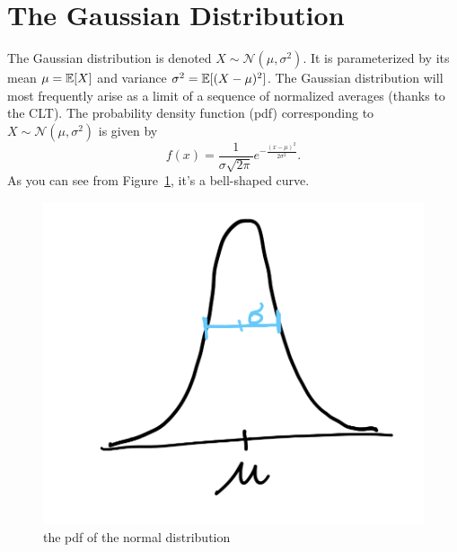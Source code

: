 \documentclass[11pt]{article}
\begin{document}
\section{The Gaussian Distribution}
The Gaussian distribution is denoted $X\sim\mathcal N(\mu,\sigma^2)$. It is parameterized by its mean $\mu=\mathbb E[X]$ and variance $\sigma^2=\mathbb E[(X-\mu)^2]$. The Gaussian distribution will most frequently arise as a limit of a sequence of normalized averages (thanks to the CLT). The probability density function (pdf) corresponding to $X\sim\mathcal N(\mu,\sigma^2)$ is given by $$f(x)=\frac{1}{\sigma\sqrt{2\pi}}e^{-\frac{(x-\mu)^2}{2\sigma^2}}.$$ 
As you can see from Figure~\ref{fig:norm}, it's a bell-shaped curve. 
\begin{figure}[h]
    \center
    \includegraphics[scale=0.15]{Images/normaldensity.png}
        \caption{the pdf of the normal distribution}
            \label{fig:norm}
\end{figure}
\end{document}
